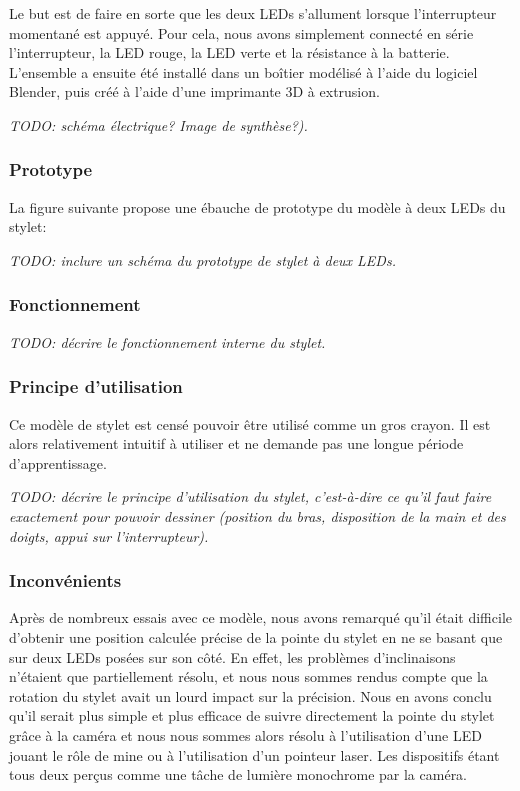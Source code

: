 \documentclass[11pt,a4paper,oldfontcommands]{memoir}
\begin{document}
Le but est de faire en sorte que les deux LEDs s'allument lorsque l'interrupteur momentané est appuyé. Pour cela, nous avons simplement connecté en série l'interrupteur, la LED rouge, la LED verte et la résistance à la batterie.
L'ensemble a ensuite été installé dans un boîtier modélisé à l'aide du logiciel Blender, puis créé à l'aide d'une imprimante 3D à extrusion.

\textit{TODO: schéma électrique? Image de synthèse?).}

\subsubsection{Prototype}

La figure suivante propose une ébauche de prototype du modèle à deux LEDs du stylet:

\textit{TODO: inclure un schéma du prototype de stylet à deux LEDs.}

\subsubsection{Fonctionnement}

\textit{TODO: décrire le fonctionnement interne du stylet.}

\subsubsection{Principe d'utilisation}

Ce modèle de stylet est censé pouvoir être utilisé comme un gros crayon. Il est alors relativement intuitif à utiliser et ne demande pas une longue période d'apprentissage.

\textit{TODO: décrire le principe d'utilisation du stylet, c'est-à-dire ce qu'il faut faire exactement pour pouvoir dessiner (position du bras, disposition de la main et des doigts, appui sur l'interrupteur).}

\subsubsection{Inconvénients}
Après de nombreux essais avec ce modèle, nous avons remarqué qu'il était difficile d'obtenir une position calculée précise de la pointe du stylet en ne se basant que sur deux LEDs posées sur son côté. En effet, les problèmes d'inclinaisons n'étaient que partiellement résolu, et nous nous sommes rendus compte que la rotation du stylet avait un lourd impact sur la précision.
Nous en avons conclu qu'il serait plus simple et plus efficace de suivre directement la pointe du stylet grâce à la caméra et nous nous sommes alors résolu à l'utilisation d'une LED jouant le rôle de mine ou à l'utilisation d'un pointeur laser. Les dispositifs étant tous deux perçus comme une tâche de lumière monochrome par la caméra.
\end{document}
